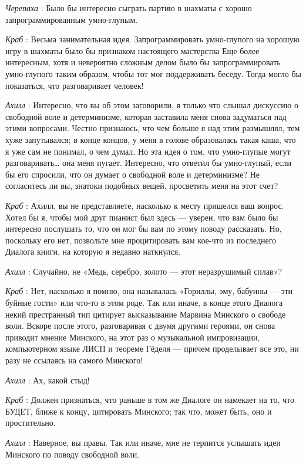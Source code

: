 \emph{Черепаха} : Было бы интересно сыграть партию в шахматы с хорошо запрограммированным умно-глупым.

\emph{Краб} : Весьма занимательная идея. Запрограммировать умно-глупого на хорошую игру в шахматы было бы признаком настоящего мастерства Еще более интересным, хотя и невероятно сложным делом было бы запрограммировать умно-глупого таким образом, чтобы тот мог поддерживать беседу. Тогда могло бы показаться, что разговаривает человек!

\emph{Ахилл} : Интересно, что вы об этом заговорили, я только что слышал дискуссию о свободной воле и детерминизме, которая заставила меня снова задуматься над этими вопросами. Честно признаюсь, что чем больше я над этим размышлял, тем хуже запутывался; в конце концов, у меня в голове образовалась такая каша, что я уже сам не понимал, о чем думал. Но эта идея о том, что умно-глупые могут разговаривать\ldots{} она меня пугает. Интересно, что ответил бы умно-глупый, если бы его спросили, что он думает о свободной воле и детерминизме? Не согласитесь ли вы, знатоки подобных вещей, просветить меня на этот счет?

\emph{Краб} : Ахилл, вы не представляете, насколько к месту пришелся ваш вопрос. Хотел бы я, чтобы мой друг пианист был здесь --- уверен, что вам было бы интересно послушать то, что он мог бы вам по этому поводу рассказать. Но, поскольку его нет, позвольте мне процитировать вам кое-что из последнего Диалога книги, на которую я недавно наткнулся.

\emph{Ахилл} : Случайно, не «Медь, серебро, золото --- этот неразрушимый сплав»?

\emph{Краб} : Нет, насколько я помню, она называлась «Гориллы, эму, бабуины --- эти буйные гости» или что-то в этом роде. Так или иначе, в конце этого Диалога некий престранный тип цитирует высказывание Марвина Минского о свободе воли. Вскоре после этого, разговаривая с двумя другими героями, он снова приводит мнение Минского, на этот раз о музыкальной импровизации, компьютерном языке ЛИСП и теореме Гёделя --- причем проделывает все это, ни разу не ссылаясь на самого Минского!

\emph{Ахилл} : Ах, какой стыд!

\emph{Краб} : Должен признаться, что раньше в том же Диалоге он намекает на то, что БУДЕТ, ближе к концу, цитировать Минского; так что, может быть, оно и простительно.

\emph{Ахилл} : Наверное, вы правы. Так или иначе, мне не терпится услышать идеи Минского по поводу свободной воли.

